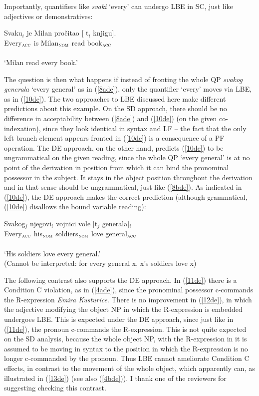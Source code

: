 \documentclass[
    output=paper,
    colorlinks,
    citecolor=brown,
]{langscibook}
\begin{document}
Importantly, quantifiers like \textit{svaki} ‘every’ can undergo LBE in SC, just like adjectives or demonstratives:

\begin{exe}
\ex \label{9de}
\gll Svaku$_{i}$ je Milan pročitao [ t$_{i}$  knjigu].\\
Every$_{\textsc{acc}}$ is Milan$_{\textsc{nom}}$ read book$_{\textsc{acc}}$\\\\
‘Milan read every book.’ 
\end{exe}

The question is then what happens if instead of fronting the whole QP \textit{svakog generala} ‘every general’ as in (\ref{8ade}), only the quantifier ‘every’ moves via LBE, as in (\ref{10de}). The two approaches to LBE discussed here make different predictions about this example. On the SD approach, there should be no difference in acceptability between (\ref{8ade}) and (\ref{10de}) (on the given co-indexation), since they look identical in syntax and LF  – the fact that the only left branch element appears fronted in (\ref{10de}) is a consequence of a PF operation. The DE approach, on the other hand, predicts (\ref{10de}) to be ungrammatical on the given reading, since the whole QP ‘every general’ is at no point of the derivation in position from which it can bind the pronominal possessor in the subject. It stays in the object position throughout the derivation and in that sense should be ungrammatical, just like (\ref{8bde}). As indicated in (\ref{10de}), the DE approach makes the correct prediction (although grammatical, (\ref{10de}) disallows the bound variable reading): 

\begin{exe}
\ex \label{10de}
\gll *Svakog$_{j}$   njegovi$_{i}$ vojnici vole     [t$_{j}$ generala]$_{i}$\\
Every$_{\textsc{acc}}$ his$_{\textsc{nom}}$ soldiers$_{\textsc{nom}}$ love {} general$_{\textsc{acc}}$\\\\
‘His soldiers love every general.’\\
(Cannot be interpreted: for every general x, x’s soldiers love x) 
\end{exe}

The following contrast also supports the DE approach. In (\ref{11de}) there is a Condition C violation, as in (\ref{4ade}), since the pronominal possessor c-commands the R-expression \textit{Emira Kusturice}. There is no improvement in (\ref{12de}), in which the adjective modifying the object NP in which the R-expression is embedded undergoes LBE. This is expected under the DE approach, since just like in (\ref{11de}), the pronoun c-commands the R-expression. This is not quite expected on the SD analysis, because the whole object NP, with the R-expression in it is assumed to be moving in syntax to the position in which the R-expression is no longer c-commanded by the pronoun. Thus LBE cannot ameliorate Condition C effects, in contrast to the movement of the whole object, which apparently can, as illustrated in (\ref{13de}) (see also (\ref{4bde})). I thank one of the reviewers for suggesting checking this contrast. 
\end{document}
